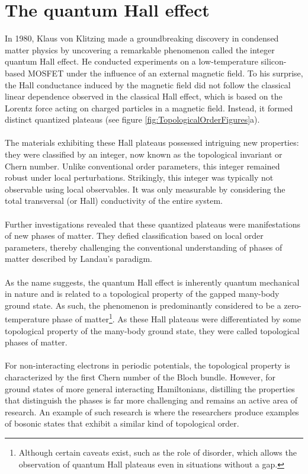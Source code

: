 \section{The quantum Hall effect}
In 1980, Klaus von Klitzing made a groundbreaking discovery in condensed matter physics by uncovering a remarkable phenomenon called the integer quantum Hall effect. He conducted experiments on a low-temperature silicon-based MOSFET under the influence of an external magnetic field. To his surprise, the Hall conductance induced by the magnetic field did not follow the classical linear dependence observed in the classical Hall effect, which is based on the Lorentz force acting on charged particles in a magnetic field. Instead, it formed distinct quantized plateaus (see figure \ref{fig:TopologicalOrderFigures}a).
\\\\
The materials exhibiting these Hall plateaus possessed intriguing new properties: they were classified by an integer, now known as the topological invariant or Chern number. Unlike conventional order parameters, this integer remained robust under local perturbations. Strikingly, this integer was typically not observable using local observables. It was only measurable by considering the total transversal (or Hall) conductivity of the entire system.
\\\\
Further investigations revealed that these quantized plateaus were manifestations of new phases of matter. They defied classification based on local order parameters, thereby challenging the conventional understanding of phases of matter described by Landau's paradigm.
\\\\
As the name suggests, the quantum Hall effect is inherently quantum mechanical in nature and is related to a topological property of the gapped many-body ground state. As such, the phenomenon is predominantly considered to be a zero-temperature phase of matter\footnote{Although certain caveats exist, such as the role of disorder, which allows the observation of quantum Hall plateaus even in situations without a gap.}. As these Hall plateaus were differentiated by some topological property of the many-body ground state, they were called topological phases of matter.
\\\\
For non-interacting electrons in periodic potentials, the topological property is characterized by the first Chern number of the Bloch bundle. However, for ground states of more general interacting Hamiltonians, distilling the properties that distinguish the phases is far more challenging and remains an active area of research. An example of such research is \cite{sopenko2023chiral} where the researchers produce examples of bosonic states that exhibit a similar kind of topological order.
